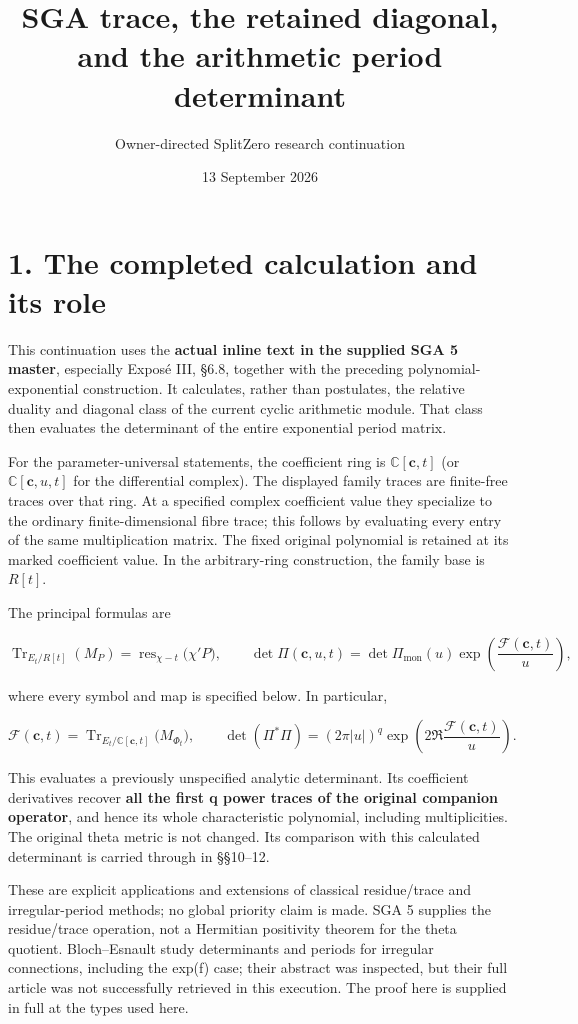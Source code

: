 \documentclass[
  11pt,
]{article}
\title{SGA trace, the retained diagonal, and the arithmetic period
determinant}
\author{Owner-directed SplitZero research continuation}
\date{13 September 2026}
\begin{document}
\maketitle

\section{1. The completed calculation and its
role}\label{the-completed-calculation-and-its-role}

This continuation uses the \textbf{actual inline text in the supplied
SGA 5 master}, especially Exposé III, §6.8, together with the preceding
polynomial-exponential construction. It calculates, rather than
postulates, the relative duality and diagonal class of the current
cyclic arithmetic module. That class then evaluates the determinant of
the entire exponential period matrix.

For the parameter-universal statements, the coefficient ring is
$\mathbb C[\mathbf c,t]$ (or $\mathbb C[\mathbf c,u,t]$ for the differential complex).
The displayed family traces are finite-free traces over that ring.
At a specified complex coefficient value they specialize to the ordinary
finite-dimensional fibre trace; this follows by evaluating every entry of
the same multiplication matrix.  The fixed original polynomial is retained
at its marked coefficient value.  In the arbitrary-ring construction,
the family base is $R[t]$.

The principal formulas are

\[
\operatorname{Tr}_{E_t/R[t]}(M_P)
 =\operatorname{res}_{\chi-t}\bigl(\chi'P\bigr),
\qquad
\det\Pi(\mathbf c,u,t)
 =\det\Pi_{\mathrm{mon}}(u)\exp\!\left(\frac{\mathcal F(\mathbf c,t)}u\right),
\tag{1}
\]

where every symbol and map is specified below. In particular,

\[
\mathcal F(\mathbf c,t)
 =\operatorname{Tr}_{E_t/\mathbb C[\mathbf c,t]}\bigl(M_{\Phi_t}\bigr),
\qquad
\det(\Pi^*\Pi)
 =(2\pi|u|)^q\exp\!\left(2\Re\frac{\mathcal F(\mathbf c,t)}u\right).
\tag{2}
\]

This evaluates a previously unspecified analytic determinant. Its
coefficient derivatives recover \textbf{all the first q power traces of
the original companion operator}, and hence its whole characteristic
polynomial, including multiplicities. The original theta metric is not
changed. Its comparison with this calculated determinant is carried
through in §§10--12.

These are explicit applications and extensions of classical
residue/trace and irregular-period methods; no global priority claim is
made. SGA 5 supplies the residue/trace operation, not a Hermitian
positivity theorem for the theta quotient. Bloch--Esnault study
determinants and periods for irregular connections, including the exp(f)
case; their abstract was inspected, but their full article was not
successfully retrieved in this execution. The proof here is supplied in
full at the types used here.
\end{document}
